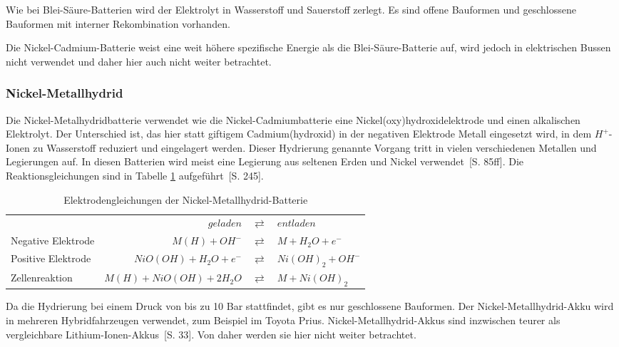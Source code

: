 Wie bei Blei-Säure-Batterien wird der Elektrolyt in Wasserstoff und Sauerstoff zerlegt. Es sind offene Bauformen und geschlossene Bauformen mit interner Rekombination vorhanden.

Die Nickel-Cadmium-Batterie weist eine weit höhere spezifische Energie als die Blei-Säure-Batterie auf, wird jedoch in elektrischen Bussen nicht verwendet und daher hier auch nicht weiter betrachtet. 

\subsubsection{Nickel-Metallhydrid}
Die Nickel-Metalhydridbatterie verwendet wie die Nickel-Cadmiumbatterie eine Nickel(oxy)hydroxidelektrode und einen alkalischen Elektrolyt. Der Unterschied ist, das hier statt giftigem Cadmium(hydroxid) in der negativen Elektrode Metall eingesetzt wird, in dem $H^+$-Ionen zu Wasserstoff reduziert und eingelagert werden. Dieser Hydrierung genannte Vorgang tritt in vielen verschiedenen Metallen und Legierungen auf. In diesen Batterien wird meist eine Legierung aus seltenen Erden und Nickel verwendet~\cite{KiehneBattery}[S. 85ff]. Die Reaktionsgleichungen sind in Tabelle \ref{NiMH} aufgeführt~\cite{Sterner:2014}[S. 245].

\begin{table}\centering %
	\begin{tabularx}{\linewidth}{XrcX}
		\toprule
		&              $geladen$ & $\rightleftarrows$ & $entladen$        \\
		Negative Elektrode &          $M(H) + OH^-$ & $\rightleftarrows$ & $M + H_2O + e^-$  \\
		Positive Elektrode &   $NiO(OH) + H_2O + e^-$ & $\rightleftarrows$ & $Ni(OH)_2 + OH^-$ \\ \midrule
		Zellenreaktion     & $M(H) + NiO(OH) + 2H_2O$ & $\rightleftarrows$ & $M + Ni(OH)_2$    \\ \bottomrule
	\end{tabularx}
	\caption{Elektrodengleichungen der Nickel-Metallhydrid-Batterie}
	\label{NiMH}
\end{table}

Da die Hydrierung bei einem Druck von bis zu 10 Bar stattfindet, gibt es nur geschlossene Bauformen. Der Nickel-Metallhydrid-Akku wird in mehreren Hybridfahrzeugen verwendet, zum Beispiel im Toyota Prius. Nickel-Metallhydrid-Akkus sind inzwischen teurer als vergleichbare Lithium-Ionen-Akkus~\cite{Schimke:2012}[S. 33]. Von daher werden sie hier nicht weiter betrachtet.

